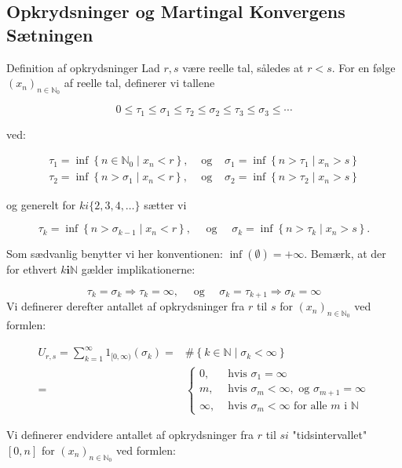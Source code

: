 \documentclass{article}
\newcommand{\1}{\mathbbm{1}}
\theoremstyle{boxed}
\begin{document}
\subsection{Opkrydsninger og Martingal Konvergens Sætningen}
Definition af opkrydsninger
Lad $r, s$ være reelle tal, således at $r<s$.
For en følge $\left(x_n\right)_{n \in \mathbb{N}_0}$ af reelle tal, definerer vi tallene

$$
0 \leq \tau_1 \leq \sigma_1 \leq \tau_2 \leq \sigma_2 \leq \tau_3 \leq \sigma_3 \leq \cdots
$$

ved:

$$
\begin{array}{lll}
\tau_1=\inf \left\{n \in \mathbb{N}_0 \mid x_n<r\right\}, & \text { og } & \sigma_1=\inf \left\{n>\tau_1 \mid x_n>s\right\} \\
\tau_2=\inf \left\{n>\sigma_1 \mid x_n<r\right\}, & \text { og } & \sigma_2=\inf \left\{n>\tau_2 \mid x_n>s\right\}
\end{array}
$$

og generelt for $k i\{2,3,4, \ldots\}$ sætter vi

$$
\tau_k=\inf \left\{n>\sigma_{k-1} \mid x_n<r\right\}, \quad \text { og } \quad \sigma_k=\inf \left\{n>\tau_k \mid x_n>s\right\} .
$$


Som sædvanlig benytter vi her konventionen: $\inf (\emptyset)=+\infty$.
Bemærk, at der for ethvert $k \mathbf{i} \mathbb{N}$ gælder implikationerne:

$$
\tau_k=\sigma_k \Longrightarrow \tau_k=\infty, \quad \text { og } \quad \sigma_k=\tau_{k+1} \Longrightarrow \sigma_k=\infty
$$
Vi definerer derefter antallet af opkrydsninger fra $r$ til $s$ for $\left(x_n\right)_{n \in \mathbb{N}_0}$ ved formlen:

$$
\begin{aligned}
U_{r, s}=\sum_{k=1}^{\infty} 1_{[0, \infty)}\left(\sigma_k\right)= & \#\left\{k \in \mathbb{N} \mid \sigma_k<\infty\right\} \\
= & \begin{cases}0, & \text { hvis } \sigma_1=\infty \\
m, & \text { hvis } \sigma_m<\infty, \text { og } \sigma_{m+1}=\infty \\
\infty, & \text { hvis } \sigma_m<\infty \text { for alle } m \text { i } \mathbb{N}\end{cases}
\end{aligned}
$$


Vi definerer endvidere antallet af opkrydsninger fra $r$ til $s i$ "tidsintervallet" $[0, n]$ for $\left(x_n\right)_{n \in \mathbb{N}_0}$ ved formlen:
\end{document}
